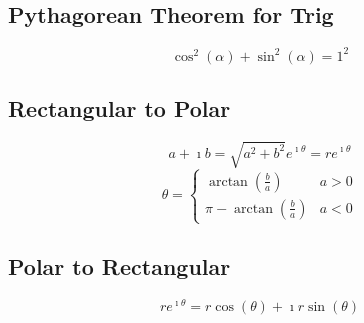 	\subsection{Pythagorean Theorem for Trig} \label{subsec:Pythagorean Theorem for Trig}
		\begin{equation} \label{eq:Pythagorean Theorem for Trig}
			\cos^{2} \left( \alpha \right) + \sin^{2} \left( \alpha \right) = 1^{2}
		\end{equation}
		
	\subsection{Rectangular to Polar} \label{subsec:Rectangular to Polar}
		\begin{equation} \label{eq:Rectangular to Polar-Magnitude}
			a + \imath b = \sqrt{a^{2}+b^{2}} e^{\imath \theta} = re^{\imath \theta}
		\end{equation}
		\begin{equation} \label{eq:Rectangular to Polar-Angle}
			\theta = \begin{cases}
				\arctan \left( \frac{b}{a} \right) & a>0 \\
				\pi - \arctan \left( \frac{b}{a} \right) & a<0
			\end{cases}
		\end{equation}
		
	\subsection{Polar to Rectangular} \label{subsec:Polar to Rectangular}
		\begin{equation} \label{eq:Polar to Rectangular}
			re^{\imath \theta} = r \cos \left( \theta \right) + \imath r \sin \left( \theta \right)
		\end{equation}